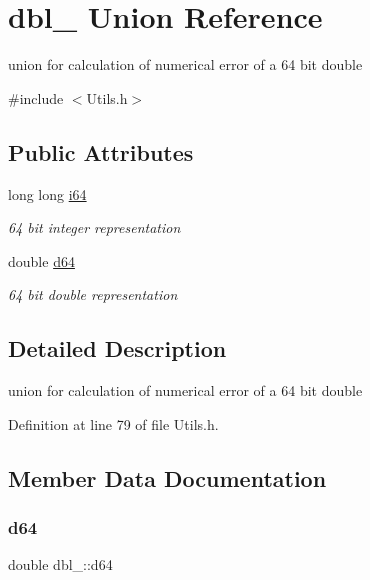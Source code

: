 \hypertarget{uniondbl__64}{}\section{dbl\+\_ Union Reference}
\label{uniondbl__64}


union for calculation of numerical error of a 64 bit double  




{\ttfamily \#include $<$Utils.\+h$>$}

\subsection*{Public Attributes}
\begin{DoxyCompactItemize}
\item 
long long \hyperlink{uniondbl__64_a6f97524990aa26aaa1618b7288301841}{i64}
\begin{DoxyCompactList}\small\item\em 64 bit integer representation \end{DoxyCompactList}\item 
double \hyperlink{uniondbl__64_a6007036e300f1924037fc32c8bec660c}{d64}
\begin{DoxyCompactList}\small\item\em 64 bit double representation \end{DoxyCompactList}\end{DoxyCompactItemize}


\subsection{Detailed Description}
union for calculation of numerical error of a 64 bit double 

Definition at line 79 of file Utils.\+h.



\subsection{Member Data Documentation}
\mbox{\label{uniondbl__64_a6007036e300f1924037fc32c8bec660c}} 
\subsubsection{\texorpdfstring{d64}{d64}}
{\footnotesize\ttfamily double dbl\+\_\+::d64}



